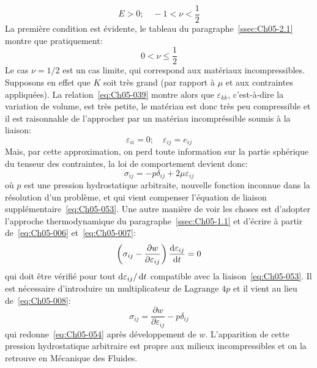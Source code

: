 \begin{equation}
    E>0; \quad -1 < \nu < \frac{1}{2}
    \label{eq:Ch05-051}
\end{equation}
La première condition est évidente, le tableau du paragraphe~\ref{ssec:Ch05-2.1} montre que pratiquement: 
\begin{equation}
    0 < \nu \leq \frac{1}{2}
    \label{eq:Ch05-052}
\end{equation}
Le cas $\nu = 1/2$ est un cas limite, qui correspond aux matériaux incompressibles.
Supposons en effet que $K$ soit très grand (par rapport à $\mu$ et aux contraintes appliquées).
La relation~\eqref{eq:Ch05-039} montre alors que $\varepsilon_{kk}$, c'est-à-dire la variation de volume, est très petite, le matériau est donc très peu compressible et il est raisonnahle de l'approcher par un matériau incompréssible soumis à la liaison: 
\begin{equation}
    \varepsilon_{ii} = 0; \quad \varepsilon_{ij} = e_{ij}
    \label{eq:Ch05-053}
\end{equation}
Mais, par cette approximation, on perd toute information sur la partie sphérique du tenseur des contraintes, la loi de comportement devient donc: 
\begin{equation}
    \sigma_{ij} = -p \delta_{ij} + 2 \mu \varepsilon_{ij}
    \label{eq:Ch05-054}
\end{equation}
où $p$ est une pression hydrostatique arbitraite, nouvelle fonction inconnue dans la résolution d'un problème, et qui vient compenser l'équation de liaison supplémentaire~\eqref{eq:Ch05-053}.
Une autre manière de voir les choses est d'adopter l'approche thermodynamique du paragraphe~\ref{ssec:Ch05-1.1} et d'écrire à partir de~\eqref{eq:Ch05-006} et~\eqref{eq:Ch05-007}: 
\begin{equation}
    \left( \sigma_{ij} - \frac{\partial w}{\partial \varepsilon_{ij}} \right) \frac{\mathop{\mathrm{{}d}}\mathopen{} \varepsilon_{ij}}{\mathop{\mathrm{{}d}}\mathopen{} t} = 0
    \label{eq:Ch05-055}
\end{equation}
qui doit être vérifié pour tout $\mathop{\mathrm{{}d}}\mathopen{} \varepsilon_{ij} / \mathop{\mathrm{{}d}}\mathopen{} t$ compatible avec la liaison~\eqref{eq:Ch05-053}. 
Il est nécessaire d'introduire un multiplicateur de Lagrange $4p$ et il vient au lieu de~\eqref{eq:Ch05-008}: 
\begin{equation}
    \sigma_{ij} = \frac{\partial w}{\partial \varepsilon_{ij}} -p\delta_{ij}
    \label{eq:Ch05-056}
\end{equation}
qui redonne~\eqref{eq:Ch05-054} après développement de $w$.
L'apparition de cette pression hydrostatique arbitraire est propre aux milieux incompressibles et on la retrouve en Mécanique des Fluides.

